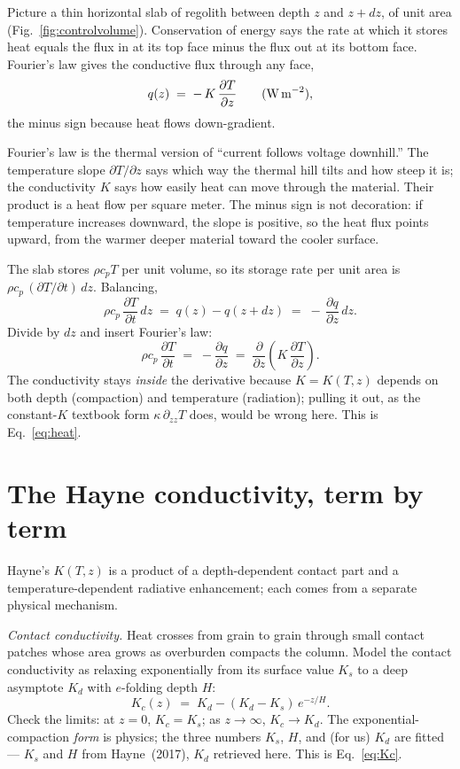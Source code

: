 \documentclass[11pt]{report}
\begin{document}
Picture a thin horizontal slab of regolith between depth $z$ and $z+dz$, of unit
area (Fig.~\ref{fig:controlvolume}). Conservation of energy says the rate at which it stores heat equals the
flux in at its top face minus the flux out at its bottom face. Fourier's law
gives the conductive flux through any face,
\[
q(z) \;=\; -\,K\,\frac{\partial T}{\partial z}
\qquad(\text{W\,m}^{-2}),
\]
the minus sign because heat flows down-gradient.

\begin{plain}
Fourier's law is the thermal version of ``current follows voltage downhill.''
The temperature slope $\partial T/\partial z$ says which way the thermal hill
tilts and how steep it is; the conductivity $K$ says how easily heat can move
through the material. Their product is a heat flow per square meter. The minus
sign is not decoration: if temperature increases downward, the slope is
positive, so the heat flux points upward, from the warmer deeper material toward
the cooler surface.
\end{plain}

The slab stores $\rho c_p T$ per
unit volume, so its storage rate per unit area is $\rho c_p\,(\partial T/\partial
t)\,dz$. Balancing,
\[
\rho c_p\,\frac{\partial T}{\partial t}\,dz
\;=\; q(z) - q(z+dz)
\;=\; -\,\frac{\partial q}{\partial z}\,dz .
\]
Divide by $dz$ and insert Fourier's law:
\[
\boxed{\;\rho c_p\,\frac{\partial T}{\partial t}
\;=\; -\frac{\partial q}{\partial z}
\;=\; \frac{\partial}{\partial z}\!\left(K\,\frac{\partial T}{\partial z}\right).\;}
\]
The conductivity stays \emph{inside} the derivative because $K=K(T,z)$ depends on
both depth (compaction) and temperature (radiation); pulling it out, as the
constant-$K$ textbook form $\kappa\,\partial_{zz}T$ does, would be wrong here.
This is Eq.~\eqref{eq:heat}.

\section{The Hayne conductivity, term by term}\label{app:hayne}
Hayne's $K(T,z)$ is a product of a depth-dependent contact part and a
temperature-dependent radiative enhancement; each comes from a separate physical
mechanism.

\emph{Contact conductivity.} Heat crosses from grain to grain through small
contact patches whose area grows as overburden compacts the column. Model the
contact conductivity as relaxing exponentially from its surface value $K_s$ to a
deep asymptote $K_d$ with $e$-folding depth $H$:
\[
K_c(z) \;=\; K_d - (K_d - K_s)\,e^{-z/H}.
\]
Check the limits: at $z=0$, $K_c=K_s$; as $z\to\infty$, $K_c\to K_d$. The
exponential-compaction \emph{form} is physics; the three numbers $K_s$, $H$, and
(for us) $K_d$ are fitted --- $K_s$ and $H$ from Hayne~(2017), $K_d$ retrieved
here. This is Eq.~\eqref{eq:Kc}.
\end{document}
